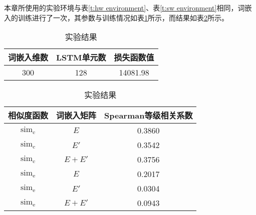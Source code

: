 本章所使用的实验环境与表\ref{t:hw environment}、表\ref{t:sw environment}相同，词嵌入的训练进行了一次，其参数与训练情况如表\ref{t:embedding train}所示，而结果如表\ref{t:embedding result}所示。

\begin{table}[h]
	\caption{实验结果}
	\label{t:embedding train}
	\vspace{0.5em}\centering\wuhao
	\begin{tabular}{ccc}
		\toprule[1.5pt]
		词嵌入维数 & LSTM单元数 & 损失函数值 \\
		\midrule[1pt]
		300 & 128 & 14081.98 \\
		\bottomrule[1.5pt]
	\end{tabular}
\end{table}

\begin{table}[h]
\caption{实验结果}
\label{t:embedding result}
\vspace{0.5em}\centering\wuhao
\begin{tabular}{ccc}
	\toprule[1.5pt]
	相似度函数 & 词嵌入矩阵 & Spearman等级相关系数 \\
	\midrule[1pt]
	$\text{sim}_\text{c}$ & $E$ & 0.3860 \\
	$\text{sim}_\text{c}$ & $E'$ &  0.3542 \\
	$\text{sim}_\text{c}$ & $E + E'$ & 0.3756 \\
	$\text{sim}_\text{e}$ & $E$ &  0.2017 \\
	$\text{sim}_\text{e}$ & $E'$ & 0.0304 \\
	$\text{sim}_\text{e}$ & $E + E'$ & 0.0943 \\
	\bottomrule[1.5pt]
\end{tabular}
\end{table}